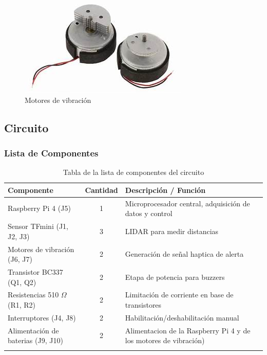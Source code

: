 \documentclass[12pt,a4paper]{article}
\begin{document}
\begin{figure}[H]
    \centering
    \includegraphics[width=0.5\linewidth]{Carpeta tecnica/Motores.png}
    \caption{Motores de vibración}
\end{figure}

\subsection{Circuito}

\subsubsection{Lista de Componentes}
\begin{longtable}{|>{\raggedright}p{4cm}|c|>{\raggedright\arraybackslash}p{8cm}|}
\hline
\textbf{Componente} & \textbf{Cantidad} & \textbf{Descripción / Función} \\
\hline
Raspberry Pi 4 (J5) & 1 & Microprocesador central, adquisición de datos y control \\
\hline
Sensor TFmini (J1, J2, J3) & 3 & LIDAR para medir distancias \\
\hline
Motores de vibración (J6, J7) & 2 & Generación de señal haptica de alerta \\
\hline
Transistor BC337 (Q1, Q2) & 2 & Etapa de potencia para buzzers \\
\hline
Resistencias 510 $\Omega$ (R1, R2) & 2 & Limitación de corriente en base de transistores \\
\hline
Interruptores (J4, J8) & 2 & Habilitación/deshabilitación manual \\
\hline
Alimentación de baterias (J9, J10) & 2 & Alimentacion de la Raspberry Pi 4 y de los motores de vibración)\\
\hline
\caption{Tabla de la lista de componentes del circuito}
\end{longtable}

\end{document}
